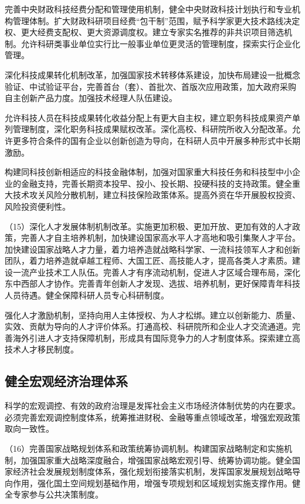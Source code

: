     完善中央财政科技经费分配和管理使用机制，健全中央财政科技计划执行和专业机构管理体制。扩大财政科研项目经费“包干制”范围，赋予科学家更大技术路线决定权、更大经费支配权、更大资源调度权。建立专家实名推荐的非共识项目筛选机制。允许科研类事业单位实行比一般事业单位更灵活的管理制度，探索实行企业化管理。

    深化科技成果转化机制改革，加强国家技术转移体系建设，加快布局建设一批概念验证、中试验证平台，完善首台（套）、首批次、首版次应用政策，加大政府采购自主创新产品力度。加强技术经理人队伍建设。

    允许科技人员在科技成果转化收益分配上有更大自主权，建立职务科技成果资产单列管理制度，深化职务科技成果赋权改革。深化高校、科研院所收入分配改革。允许更多符合条件的国有企业以创新创造为导向，在科研人员中开展多种形式中长期激励。

    构建同科技创新相适应的科技金融体制，加强对国家重大科技任务和科技型中小企业的金融支持，完善长期资本投早、投小、投长期、投硬科技的支持政策。健全重大技术攻关风险分散机制，建立科技保险政策体系。提高外资在华开展股权投资、风险投资便利性。

    （15）深化人才发展体制机制改革。实施更加积极、更加开放、更加有效的人才政策，完善人才自主培养机制，加快建设国家高水平人才高地和吸引集聚人才平台。加快建设国家战略人才力量，着力培养造就战略科学家、一流科技领军人才和创新团队，着力培养造就卓越工程师、大国工匠、高技能人才，提高各类人才素质。建设一流产业技术工人队伍。完善人才有序流动机制，促进人才区域合理布局，深化东中西部人才协作。完善青年创新人才发现、选拔、培养机制，更好保障青年科技人员待遇。健全保障科研人员专心科研制度。

    强化人才激励机制，坚持向用人主体授权、为人才松绑。建立以创新能力、质量、实效、贡献为导向的人才评价体系。打通高校、科研院所和企业人才交流通道。完善海外引进人才支持保障机制，形成具有国际竞争力的人才制度体系。探索建立高技术人才移民制度。

    \subsection{健全宏观经济治理体系}

    科学的宏观调控、有效的政府治理是发挥社会主义市场经济体制优势的内在要求。必须完善宏观调控制度体系，统筹推进财税、金融等重点领域改革，增强宏观政策取向一致性。

    （16）完善国家战略规划体系和政策统筹协调机制。构建国家战略制定和实施机制，加强国家重大战略深度融合，增强国家战略宏观引导、统筹协调功能。健全国家经济社会发展规划制度体系，强化规划衔接落实机制，发挥国家发展规划战略导向作用，强化国土空间规划基础作用，增强专项规划和区域规划实施支撑作用。健全专家参与公共决策制度。

